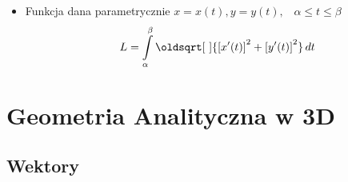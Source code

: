 \documentclass[10pt, twoside, fleqn]{article}
\renewcommand*{\sqrt}[2][\ ]{\oldsqrt[#1]{#2}}
\begin{document}
\begin{enumerate}
\begin{itemize}
						\item Funkcja dana parametrycznie
							  $ x=x(t), y=y(t), \hspace{10pt}
							  	\alpha \le t \le \beta $					
									\begin{equation*}
										L=\int\limits_
											\alpha^\beta
												{\sqrt{\left[x'(t)\right]^2 	
												 + \left[y'(t)\right]^2}
										   \,dt}
									\end{equation*}						
					\end{itemize}				
						
							
				\end{enumerate}
				
		\newpage
			\section{Geometria Analityczna w 3D}
				
				
\subsection{Wektory}
\end{document}
